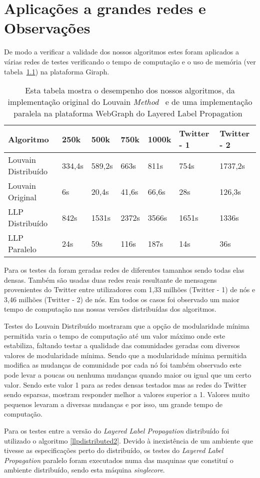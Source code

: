 \chapter{Aplicações a grandes redes e Observações}
De modo a verificar a validade dos nossos algoritmos estes foram aplicados a 
várias redes de testes verificando o tempo de computação e o uso de memória (ver 
tabela~\ref{tbl:tm}) na plataforma Giraph.
\begin{table}
	\centering
 \begin{tabular}{|l|l|l|l|l|l|l|}
 \hline
			Algoritmo & 250k & 500k & 750k & 1000k & Twitter - 1 & Twitter - 2\\ \hline
			Louvain Distribuído&334,4s&589,2s&663s&811s&754s&1737,2s\\ \hline
			Louvain Original&6s&20,4s&41,6s&66,6s&28s&126,3s\\ \hline
			LLP Distribuído& 842s & 1531s & 2372s & 3566s & 1651s &	
1336s
\\ \hline
			LLP Paralelo&24s&59s&116s&187s&14s&36s \\ \hline
		\end{tabular}
		\caption{Esta tabela mostra o desempenho dos nossos algoritmos,
		da implementação original do Louvain 
\textit{Method}~\cite{orgLouvain} e de uma implementação paralela na plataforma 
WebGraph do Layered Label Propagation~\cite{prlLLP}}
		\label{tbl:tm}
\end{table}

  Para os testes da foram geradas redes de diferentes tamanhos sendo todas 
elas densas. Também são usadas duas redes reais resultante de mensagens 
provenientes do Twitter entre utilizadores com 1,33 milhões (Twitter - 1) de nós 
e 3,46 milhões (Twitter - 2) de nós. Em todos os casos foi observado um maior 
tempo de computação nas nossas versões distribuídas dos algoritmos.

Testes do Louvain Distribuído mostraram que a opção de modularidade mínima 
permitida varia o tempo de computação até um valor máximo onde este estabiliza, 
faltando testar a qualidade das comunidades geradas com diversos valores de 
modularidade mínima. 
Sendo que a modularidade mínima permitida modifica as mudanças de comunidade
por cada nó foi também observado este pode levar a poucas ou nenhuma mudanças 
quando maior ou igual que um certo valor. Sendo este valor 1 para as redes 
densas testados mas as redes do Twitter sendo esparsas, mostram responder melhor 
a valores superior a 1. Valores muito pequenos levaram a diversas mudanças e por 
isso, um grande tempo de computação.

Para os testes entre a versão do \textit{Layered Label Propagation} distribuído 
foi utilizado o algoritmo \ref{llpdistributed2}. Devido à inexistência de um 
ambiente que tivesse as especificações perto do distribuído, os testes do 
\textit{Layered Label Propagation} paralelo foram executados numa das maquinas 
que constituí o ambiente distribuído, sendo esta máquina \textit{singlecore}.